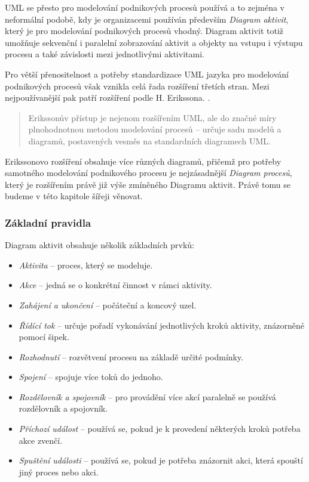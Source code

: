 UML se přesto pro modelování podnikových procesů používá a to zejména v neformální podobě, kdy je organizacemi používán především \textit{Diagram aktivit}, který je pro modelování podnikových procesů vhodný. Diagram aktivit totiž umožňuje sekvenční i paralelní zobrazování aktivit a objekty na vstupu i výstupu procesu a také závislosti mezi jednotlivými aktivitami.

Pro větší přenositelnost a potřeby standardizace UML jazyka pro modelování podnikových procesů však vznikla celá řada rozšíření třetích stran. Mezi nejpoužívanější pak patří rozšíření podle H. Erikssona. \cite{Repa2007,Eriksson2000}. 

\begin{quote}
Erikssonův přístup je nejenom rozšířením UML, ale do značné míry plnohodnotnou metodou modelování procesů – určuje sadu modelů a diagramů, postavených vesměs na standardních diagramech UML. \cite{Repa2007}
\end{quote}

Erikssonovo rozšíření obsahuje více různých diagramů, přičemž pro potřeby samotného modelování podnikového procesu je nejzásadnější \textit{Diagram procesů}, který je rozšířením právě již výše zmíněného Diagramu aktivit. Právě tomu se budeme v této kapitole šířeji věnovat.

\subsubsection{Základní pravidla}
Diagram aktivit obsahuje několik základních prvků: \cite{UMLActivity}

\begin{itemize}
\item \textit{Aktivita} – proces, který se modeluje.
\item \textit{Akce} – jedná se o konkrétní činnost v rámci aktivity.
\item \textit{Zahájení a ukončení} – počáteční a koncový uzel.
\item \textit{Řídící tok} – určuje pořadí vykonávání jednotlivých kroků aktivity, znázorněné pomocí šipek.
\item \textit{Rozhodnutí} – rozvětvení procesu na základě určité podmínky.
\item \textit{Spojení} – spojuje více toků do jednoho.
\item \textit{Rozdělovník a spojovník} – pro provádění více akcí paralelně se používá rozdělovník a spojovník.
\item \textit{Příchozí událost} – používá se, pokud je k provedení některých kroků potřeba akce zvenčí.
\item \textit{Spuštění události} – používá se, pokud je potřeba znázornit akci, která spouští jiný proces nebo akci.
\end{itemize}

